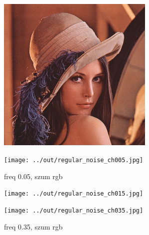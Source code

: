\documentclass[a4paper,12pt]{article}
\begin{document}
\begin{figure}[h!]
\begin{minipage}[t]{7.5cm}
\begin{center}
\includegraphics[width=7.5cm,clip]{../../lena.jpg}
\caption{orginal}
\end{center}
\end{minipage}
\hfill
\begin{minipage}[t]{7.5cm}
\begin{center}
\texttt{[image: ../out/regular\_noise\_ch005.jpg]}
\caption{freq 0.05, szum r\protect g\protect b\protect}
\end{center}
\end{minipage}
\end{figure}

\begin{figure}[h!]
\begin{minipage}[t]{7.5cm}
\begin{center}
\texttt{[image: ../out/regular\_noise\_ch015.jpg]}
\caption{freq 0.15, szum r\protect g\protect b\protect}
\end{center}
\end{minipage}
\hfill
\begin{minipage}[t]{7.5cm}
\begin{center}
\texttt{[image: ../out/regular\_noise\_ch035.jpg]}
\caption{freq 0.35, szum r\protect g\protect b\protect}
\end{center}
\end{minipage}
\end{figure}
\end{document}
